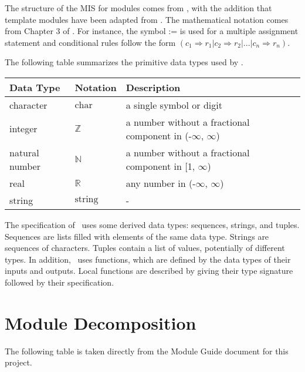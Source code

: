 \documentclass[12pt, titlepage]{article}
\begin{document}

The structure of the MIS for modules comes from \citet{HoffmanAndStrooper1995},
with the addition that template modules have been adapted from
\cite{GhezziEtAl2003}.  The mathematical notation comes from Chapter 3 of
\citet{HoffmanAndStrooper1995}.  For instance, the symbol := is used for a
multiple assignment statement and conditional rules follow the form $(c_1
\Rightarrow r_1 | c_2 \Rightarrow r_2 | ... | c_n \Rightarrow r_n )$.

The following table summarizes the primitive data types used by \progname. 

\begin{center}
\renewcommand{\arraystretch}{1.2}
\noindent 
\begin{tabular}{l l p{7.5cm}} 
\toprule 
\textbf{Data Type} & \textbf{Notation} & \textbf{Description}\\ 
\midrule
character & $\text{char}$ & a single symbol or digit\\
integer & $\mathbb{Z}$ & a number without a fractional component in (-$\infty$,
$\infty$) \\
natural number & $\mathbb{N}$ & a number without a fractional component in [1,
$\infty$) \\
real & $\mathbb{R}$ & any number in (-$\infty$, $\infty$)\\
string & $\text{string}$ & -\\
\bottomrule
\end{tabular} 
\end{center}

\noindent
The specification of \progname \ uses some derived data types: sequences,
strings, and tuples. Sequences are lists filled with elements of the same data
type. Strings are sequences of characters. Tuples contain a list of values,
potentially of different types. In addition, \progname \ uses functions, which
are defined by the data types of their inputs and outputs. Local functions are
described by giving their type signature followed by their specification.

\section{Module Decomposition}

The following table is taken directly from the Module Guide document for this
project.
\end{document}
